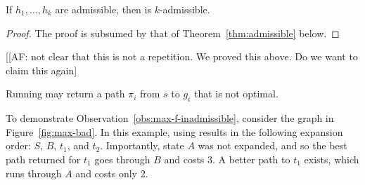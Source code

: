 \begin{theorem}
  \label{thm:min-f}
  If $h_1,\dots,h_k$ are admissible, then \kastarmin is $k$-admissible.
\end{theorem}
\begin{proof}
  The proof is subsumed by that of Theorem~\ref{thm:admissible} below.
\end{proof}

[[AF: not clear that this is not a repetition. We proved this above. Do we want to claim this again]

\begin{observation}
  \label{obs:max-f-inadmissible}
  Running \kastarmax may return a path $\pi_i$ from $s$ to $g_i$ that is not optimal.
\end{observation}


To demonstrate Observation~\ref{obs:max-f-inadmissible}, consider the graph in Figure~\ref{fig:max-bad}.
In this example, using \kastarmax results in the following expansion order: $S$, $B$, $t_1$, and $t_2$.
Importantly, state $A$ was not expanded, and so the best path returned for $t_1$ goes through $B$ and costs 3.
A better path to $t_1$ exists, which runs through $A$ and costs only 2.

